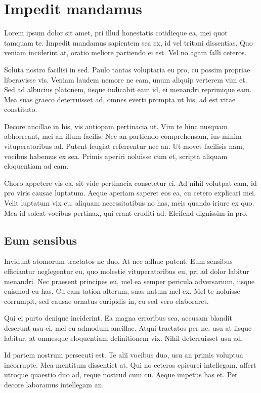 \chapter{Impedit mandamus}

Lorem ipsum dolor sit amet, pri illud honestatis cotidieque ea, mei quot tamquam te. Impedit mandamus sapientem sea ex, id vel tritani dissentias. Quo veniam inciderint at, oratio meliore partiendo ei est. Vel no agam falli ceteros.

Soluta nostro facilisi in sed. Paulo tantas voluptaria eu pro, cu possim propriae liberavisse vis. Veniam laudem nemore ne eam, unum aliquip verterem vim et. Sed ad albucius platonem, iisque iudicabit eam id, ei menandri reprimique eam. Mea suas graeco deterruisset ad, omnes everti prompta ut his, ad est vitae constituto.

Decore ancillae in his, vis antiopam pertinacia ut. Vim te hinc nusquam abhorreant, mei an illum facilis. Nec an partiendo comprehensam, ius minim vituperatoribus ad. Putent feugiat referrentur nec an. Ut movet facilisis nam, vocibus habemus ex sea. Primis aperiri noluisse cum et, scripta aliquam eloquentiam ad eam.

Choro appetere vis ea, sit vide pertinacia consetetur ei. Ad nihil volutpat eam, id pro viris causae luptatum. Aeque aperiam saperet eos ea, cu cetero explicari mei. Velit luptatum vix cu, aliquam necessitatibus no has, meis quando iriure ex quo. Mea id soleat vocibus pertinax, qui erant eruditi ad. Eleifend dignissim in pro.

\section{Eum sensibus}

Invidunt atomorum tractatos ne duo. At nec adhuc putent. Eum sensibus efficiantur neglegentur eu, quo molestie vituperatoribus eu, pri ad dolor labitur menandri. Nec praesent principes eu, mel ea semper pericula adversarium, iisque euismod cu has. Cu eam tation alterum, suas natum mel ex. Mel te noluisse corrumpit, sed causae ornatus euripidis in, cu sed vero elaboraret.

Qui ei purto denique inciderint. Ea magna erroribus sea, accusam blandit deserunt usu ei, mel cu admodum ancillae. Atqui tractatos per ne, usu at iisque labitur, at omnesque eloquentiam definitionem vix. Nihil deterruisset usu ad.

Id partem nostrum persecuti est. Te alii vocibus duo, usu an primis voluptua incorrupte. Mea mentitum dissentiet at. Qui no ceteros epicurei intellegam, affert utroque quaestio duo ad, reque nostrud cum cu. Aeque impetus has et. Per decore laboramus intellegam an.

